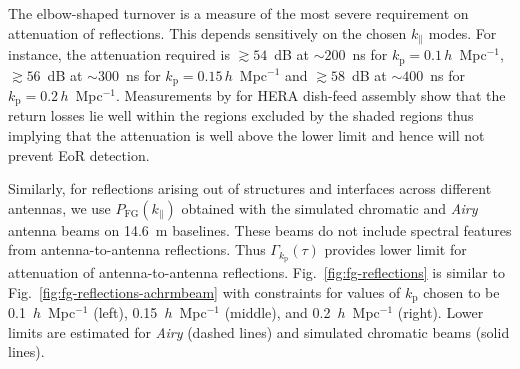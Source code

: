\documentclass[preprint2,iop,numberedappendix,twocolappendix,appendixfloats]{emulateapj}
\begin{document}
The elbow-shaped turnover is a measure of the most severe requirement on attenuation of reflections. This depends sensitively on the chosen $k_\parallel$ modes. For instance, the attenuation required is $\gtrsim 54$~dB at $\sim 200$~ns for $k_\textrm{p}=0.1\,h$~Mpc$^{-1}$, $\gtrsim 56$~dB at $\sim 300$~ns for $k_\textrm{p}=0.15\,h$~Mpc$^{-1}$ and $\gtrsim 58$~dB at $\sim 400$~ns for $k_\textrm{p}=0.2\,h$~Mpc$^{-1}$. Measurements by \citet{pat16} for HERA dish-feed assembly show that the return losses lie well within the regions excluded by the shaded regions thus implying that the attenuation is well above the lower limit and hence will not prevent EoR detection.

Similarly, for reflections arising out of structures and interfaces across different antennas, we use $P_\textrm{FG}(k_\parallel)$ obtained with the simulated chromatic and {\it Airy} antenna beams on 14.6~m baselines. These beams do not include spectral features from antenna-to-antenna reflections. Thus $\Gamma_{k_\textrm{p}}(\tau)$ provides lower limit for attenuation of antenna-to-antenna reflections. Fig.~\ref{fig:fg-reflections} is similar to Fig.~\ref{fig:fg-reflections-achrmbeam} with constraints for values of $k_\textrm{p}$ chosen to be 0.1~$h$~Mpc$^{-1}$ (left), 0.15~$h$~Mpc$^{-1}$ (middle), and 0.2~$h$~Mpc$^{-1}$ (right). Lower limits are estimated for {\it Airy} (dashed lines) and simulated chromatic beams (solid lines).
\end{document}
